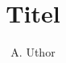 \documentclass[aspectratio=169]{beamer}
\title[Titel]{Titel}
\author[A. Uthor]{A. Uthor}
\date[]{}
\begin{document}
\begin{frame}
\titlepage
\end{frame}

%
\end{document}
